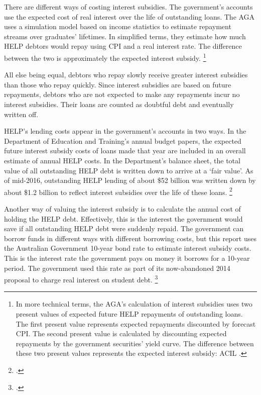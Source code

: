 \documentclass[embargoed]{grattan}
\begin{document}
There are different ways of costing interest subsidies.
The government's accounts use the expected cost of real interest over the life of outstanding loans.
The \gls{AGA} uses a simulation model based on income statistics to estimate repayment streams over graduates' lifetimes.
In simplified terms, they estimate how much \gls{HELP} debtors would repay using \gls{CPI} and a real interest rate.
The difference between the two is approximately the expected interest subsidy.%
\footnote{In more technical terms, the \gls{AGA}'s calculation of interest subsidies uses two present values of expected future \gls{HELP} repayments of outstanding loans.
The first present value represents expected repayments discounted by forecast \gls{CPI}.
The second present value is calculated by discounting expected repayments by the government securities' yield curve.
The difference between these two present values represents the expected interest subsidy: ACIL \textcite[][appendix A]{Consulting2013PrivatisationHECSdebt}.}

All else being equal, debtors who repay slowly receive greater interest subsidies than those who repay quickly.
Since interest subsidies are based on future repayments, debtors who are not expected to make any repayments incur no interest subsidies.
Their loans are counted as doubtful debt and eventually written off.

\gls{HELP}'s lending costs appear in the government's accounts in two ways.
In the Department of Education and Training's annual budget papers, the expected future interest subsidy costs of loans made that year are included in an overall estimate of annual \gls{HELP} costs.
In the Department's balance sheet, the total value of all outstanding \gls{HELP} debt is written down to arrive at a `fair value'.
As of mid-2016, outstanding \gls{HELP} lending of about \$52 billion was written down by about \$1.2 billion to reflect interest subsidies over the life of these loans.%
\footcite[][176]{Education2016Annualreport}

Another way of valuing the interest subsidy is to calculate the annual cost of holding the \gls{HELP} debt.
Effectively, this is the interest the government would save if all outstanding \gls{HELP} debt were suddenly repaid.
The government can borrow funds in different ways with different borrowing costs, but this report uses the Australian Government 10-year bond rate to estimate interest subsidy costs.
This is the interest rate the government pays on money it borrows for a 10-year period.
The government used this rate as part of its now-abandoned 2014 proposal to charge real interest on student debt.%
\footcite{Australia2014HigherEducationResearch}
\end{document}
